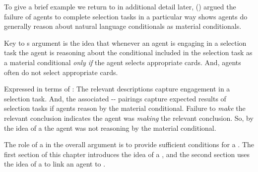 \begin{note}
  To give a brief example we return to in additional detail later, \citeauthor{Wason:1966aa} (\citeyear{Wason:1966aa}) argued the failure of agents to complete selection tasks in a particular way shows agents do generally reason about natural language conditionals as material conditionals.

  Key to \citeauthor{Wason:1966aa}s argument is the idea that whenever an agent is engaging in a selection task the agent is reasoning about the conditional included in the selection task as a material conditional \emph{only if} the agent selects appropriate cards.
  And, agents often do not select appropriate cards.

  Expressed in terms of :
  The relevant descriptions capture engagement in a selection task.
  And, the associated -- pairings capture expected results of selection tasks if agents reason by the material conditional.
  Failure to \emph{make} the relevant conclusion indicates the agent was \emph{making} the relevant conclusion.
  So, by the idea of a \tpro{} the agent was not reasoning by the material conditional.
\end{note}


\begin{note}
  The role of a  in the overall argument is to provide sufficient conditions for a \requ{}.
  The first section of this chapter introduces the idea of a , and the second section uses the idea of a  to link an agent \tCN{} to .
\end{note}


\section{}
\label{cha:typical:int}



\subsection{}
\label{cha:typical:tCDef:ToRdef}


